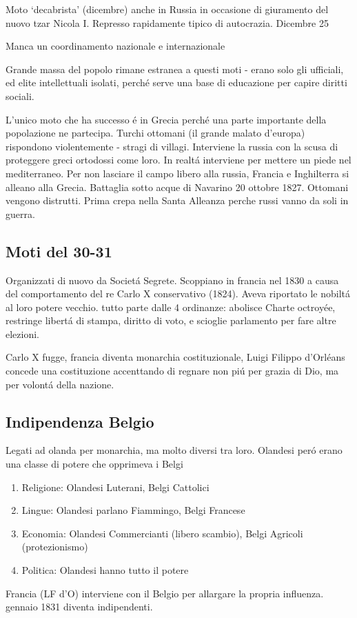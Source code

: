 \documentclass{article}
\begin{document}
Moto `decabrista' (dicembre) anche in Russia in occasione di giuramento del nuovo tzar Nicola I. Represso rapidamente tipico di autocrazia. Dicembre 25

Manca un coordinamento nazionale e internazionale

Grande massa del popolo rimane estranea a questi moti - erano solo gli ufficiali, ed elite intellettuali isolati, perché serve una base di educazione per capire diritti sociali.

L'unico moto che ha successo é in Grecia perché una parte importante della popolazione ne partecipa. Turchi ottomani (il grande malato d'europa) rispondono violentemente - stragi di villagi. Interviene la russia con la scusa di proteggere greci ortodossi come loro. In realtá interviene per mettere un piede nel mediterraneo. Per non lasciare il campo libero alla russia, Francia e Inghilterra si alleano alla Grecia. Battaglia sotto acque di Navarino 20 ottobre 1827. Ottomani vengono distrutti. Prima crepa nella Santa Alleanza perche russi vanno da soli in guerra.
\subsection{Moti del 30-31}
Organizzati di nuovo da Societá Segrete. Scoppiano in francia nel 1830 a causa del comportamento del re Carlo X conservativo (1824). Aveva riportato le nobiltá al loro potere vecchio. tutto parte dalle 4 ordinanze: abolisce Charte octroyée, restringe libertá di stampa, diritto di voto, e scioglie parlamento per fare altre elezioni.

Carlo X fugge, francia diventa monarchia costituzionale, Luigi Filippo d'Orléans concede una costituzione accenttando di regnare non piú per grazia di Dio, ma per volontá della nazione.
\subsection{Indipendenza Belgio}
Legati ad olanda per monarchia, ma molto diversi tra loro. Olandesi peró erano una classe di potere che opprimeva i Belgi
\begin{enumerate}
\item Religione: Olandesi Luterani, Belgi Cattolici
\item Lingue: Olandesi parlano Fiammingo, Belgi Francese
\item Economia: Olandesi Commercianti (libero scambio), Belgi Agricoli (protezionismo)
\item Politica: Olandesi hanno tutto il potere
\end{enumerate}
Francia (LF d'O) interviene con il Belgio per allargare la propria influenza. gennaio 1831 diventa indipendenti.
\end{document}
